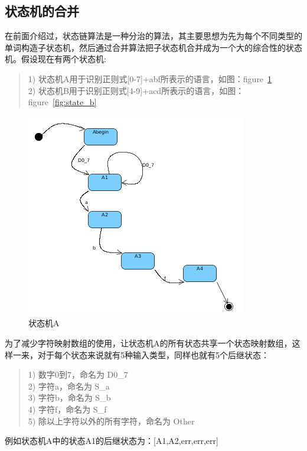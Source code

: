 \documentclass[a4paper,11pt]{article}
\begin{document}
\begin{CJK}{UTF8}{gbsn}
\subsection{状态机的合并}
在前面介绍过，状态链算法是一种分治的算法，其主要思想为先为每个不同类型的单词构造子状态机，然后通过合并算法把子状态机合并成为一个大的综合性的状态机。假设现在有两个状态机:
\begin{quote}
1) 状态机A用于识别正则式[0-7]+abf所表示的语言，如图：figure~\ref{fig:state_a}\\
2) 状态机B用于识别正则式[4-9]+acd所表示的语言，如图：figure~\ref{fig:state_b}
\end{quote}
\begin{figure}
 \centering
 \includegraphics[scale=1]{s_a.png}
 \caption{状态机A}
 \label{fig:state_a}
\end{figure}
为了减少字符映射数组的使用，让状态机A的所有状态共享一个状态映射数组，这样一来，对于每个状态来说就有5种输入类型，同样也就有5个后继状态：
\begin{quote}
1) 数字0到7，命名为 D0\_7  \\
2) 字符a，命名为 S\_a  \\
3) 字符b，命名为 S\_b \\
4) 字符f，命名为 S\_f \\
5) 除以上字符以外的所有字符，命名为 Other
\end{quote}
例如状态机A中的状态A1的后继状态为：[A1,A2,err,err,err] 


\end{CJK}
\end{document}
